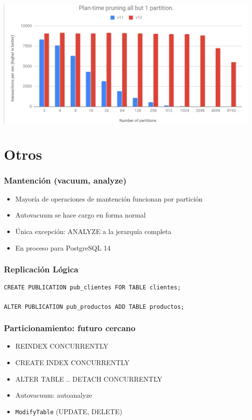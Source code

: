\documentclass[ignorenonframetext,t]{beamer}
\begin{document}
\begin{frame}
	\center
	\includegraphics{plantime-prune.png}
\end{frame}

\section{Otros}
\begin{frame}
	\frametitle{Mantención (vacuum, analyze)}
	\begin{itemize}
		\item Mayoría de operaciones de mantención funcionan por partición
		\item Autovacuum se hace cargo en forma normal
		\item Única excepción: ANALYZE a la jerarquía completa
		\item En proceso para PostgreSQL 14
	\end{itemize}
\end{frame}

\begin{frame}[fragile]
	\frametitle{Replicación Lógica}

\begin{lstlisting}
CREATE PUBLICATION pub_clientes FOR TABLE clientes;

ALTER PUBLICATION pub_productos ADD TABLE productos;
\end{lstlisting}

\end{frame}

\begin{frame}
	\frametitle{Particionamiento: futuro cercano}

	\begin{itemize}
		\item REINDEX CONCURRENTLY
		\item CREATE INDEX CONCURRENTLY
		\item ALTER TABLE .. DETACH CONCURRENTLY
			\pause
		\item Autovacuum: autoanalyze
			\pause
		\item \texttt{ModifyTable} (UPDATE, DELETE)
	\end{itemize}
\end{frame}
\end{document}
